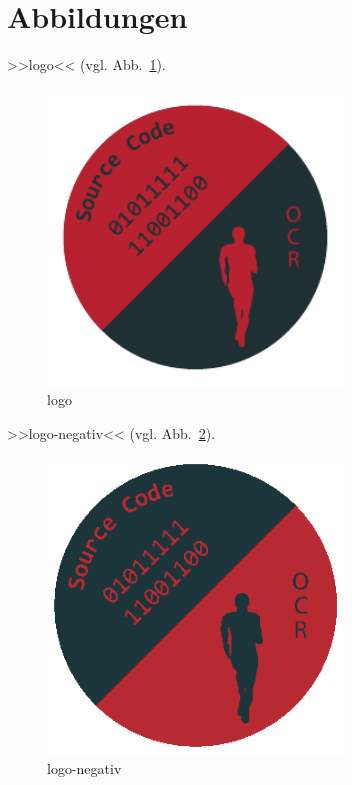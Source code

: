 \section{Abbildungen}\label{abbildungen} 

>>logo<< (vgl. Abb.~\ref{fig:logo}).%
\begin{figure}[H]%
  \centering
  \includegraphics[width=0.7\textwidth]{images/logo}
  \caption{logo}%
  \label{fig:logo}%
\end{figure}
  

>>logo-negativ<< (vgl. Abb.~\ref{fig:logo-negativ}).%
\begin{figure}[H]%
  \centering
  \includegraphics[width=0.7\textwidth]{images/logo-negativ}
  \caption{logo-negativ}%
  \label{fig:logo-negativ}%
\end{figure}
  

